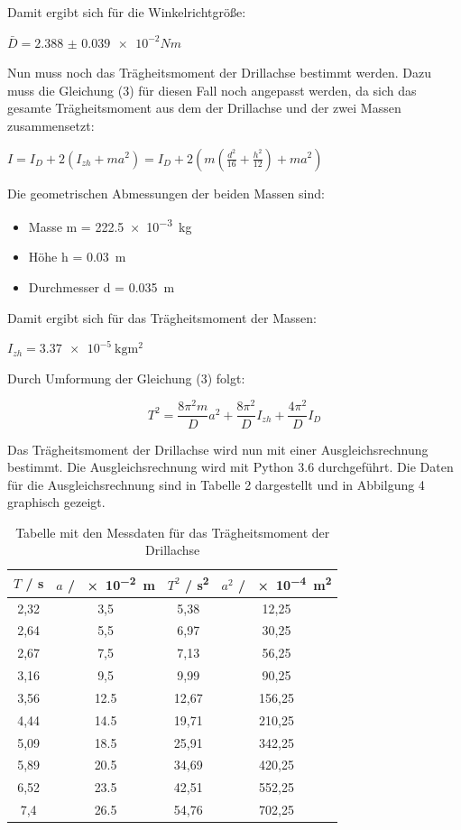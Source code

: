 Damit ergibt sich für die Winkelrichtgröße:

\centerline{$\bar{D} = \num{2.388(39)e-2} Nm$}

Nun muss noch das Trägheitsmoment der Drillachse bestimmt werden. Dazu muss
die Gleichung (3) für diesen Fall noch angepasst werden, da sich das gesamte
Trägheitsmoment aus dem der Drillachse und der zwei Massen zusammensetzt:

$I = I_D + 2(I_{zh} + ma^2) = I_D + 2(m \left( \frac{d^2}{16} + \frac{h^2}{12} \right)
+ ma^2)$

Die geometrischen Abmessungen der beiden Massen sind:

\begin{itemize}
  \item Masse m = \SI{222.5e-3}{\kilo\gram}
  \item Höhe h = \SI{0.03}{\meter}
  \item Durchmesser d = \SI{0.035}{\meter}
\end{itemize}

Damit ergibt sich für das Trägheitsmoment der Massen:

\centerline{$I_{zh} = \SI{3.37e-5}{\kilo\gram\meter\squared}$}

Durch Umformung der Gleichung (3) folgt:

\begin{equation}
  T^2 = \frac{8\pi^2m}{D} a^2 + \frac{8\pi^2}{D} I_{zh} + \frac{4\pi^2}{D} I_D
\end{equation}


Das Trägheitsmoment der Drillachse wird nun mit einer Ausgleichsrechnung bestimmt.
Die Ausgleichsrechnung wird mit Python 3.6 durchgeführt. Die Daten für die Ausgleichsrechnung
sind in Tabelle 2 dargestellt und in Abbilgung 4 graphisch gezeigt.

\begin{table}
  \centering
  \caption{Tabelle mit den Messdaten für das Trägheitsmoment der Drillachse}
  \begin{tabular}{c c c c}
    \toprule
    $T$ / \si{\second} & $a$ / \SI{e-2}{\meter} & $T^2$ / \si{\second\squared} &
    $a^2$ / \SI{e-4}{\meter\squared} \\
    \midrule
    2,32 & 3,5  & 5,38  & 12,25 \\
    2,64 & 5,5  & 6,97  & 30,25 \\
    2,67 & 7,5  & 7,13  & 56,25 \\
    3,16 & 9,5  & 9,99  & 90,25 \\
    3,56 & 12.5 & 12,67 & 156,25 \\
    4,44 & 14.5 & 19,71 & 210,25 \\
    5,09 & 18.5 & 25,91 & 342,25 \\
    5,89 & 20.5 & 34,69 & 420,25 \\
    6,52 & 23.5 & 42,51 & 552,25 \\
    7,4  & 26.5 & 54,76 &  702,25 \\
    \bottomrule
  \end{tabular}
\end{table}

